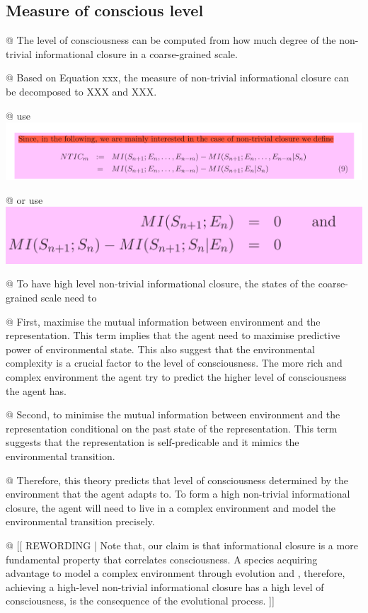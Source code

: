 \documentclass[utf8]{article}
\newenvironment{ants}
			{
			 \begin{easylist}[itemize]
			}
			{
			\end{easylist}
			}
\newcommand{\rewording}[1]{\textcolor{RawSienna}{[[ REWORDING | #1 ]]}}
\begin{document}
		\subsection{Measure of conscious level}
			\begin{ants}
				@ The level of consciousness can be computed from how much degree of the non-trivial informational closure in a coarse-grained scale.
				
				@ Based on Equation xxx, the measure of non-trivial informational closure can be decomposed to XXX and XXX.
				
				@ use \includegraphics{WritingMaterials/PDFXCview_2018-06-01_17-44-30.png}
				
				@ or use \includegraphics{WritingMaterials/PDFXCview_2018-06-04_19-18-12.png}
				
				@ To have high level non-trivial informational closure, the states of the coarse-grained scale need to
				
				@ First, maximise the mutual information between environment and the representation.
				This term implies that the agent need to maximise predictive power of environmental state. This also suggest that the environmental complexity is a crucial factor to the level of consciousness. The more rich and complex environment the agent try to predict the higher level of consciousness the agent has. 
				
				
				@ Second, to minimise the mutual information between environment and the representation conditional on the past state of the representation. This term suggests that the representation is self-predicable and it mimics the environmental transition. 
				
				@ Therefore, this theory predicts that level of consciousness determined by the environment that the agent adapts to. To form a high non-trivial informational closure, the agent will need to live in a complex environment and model the environmental transition precisely. 
				
				@ \rewording{Note that, our claim is that informational closure is a more fundamental property that correlates consciousness. A species acquiring advantage to model a complex environment through evolution and , therefore, achieving a high-level non-trivial informational closure has a high level of consciousness, is the consequence of the evolutional process. }
				
				
			\end{ants}
		
\end{document}
